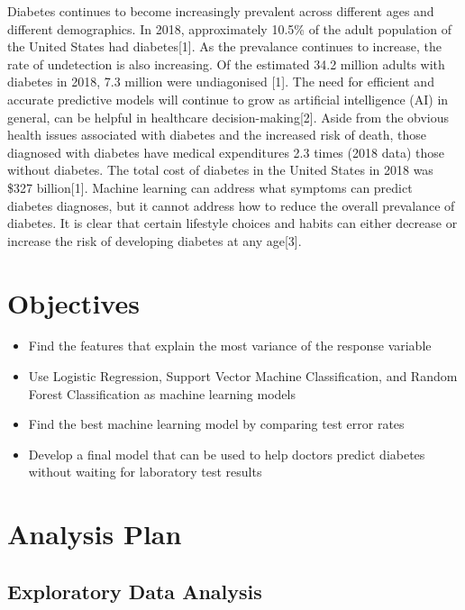 \documentclass[
]{article}
\begin{document}
Diabetes continues to become increasingly prevalent across different
ages and different demographics. In 2018, approximately 10.5\% of the
adult population of the United States had diabetes{[}1{]}. As the
prevalance continues to increase, the rate of undetection is also
increasing. Of the estimated 34.2 million adults with diabetes in 2018,
7.3 million were undiagonised {[}1{]}. The need for efficient and
accurate predictive models will continue to grow as artificial
intelligence (AI) in general, can be helpful in healthcare
decision-making{[}2{]}. Aside from the obvious health issues associated
with diabetes and the increased risk of death, those diagnosed with
diabetes have medical expenditures 2.3 times (2018 data) those without
diabetes. The total cost of diabetes in the United States in 2018 was
\$327 billion{[}1{]}. Machine learning can address what symptoms can
predict diabetes diagnoses, but it cannot address how to reduce the
overall prevalance of diabetes. It is clear that certain lifestyle
choices and habits can either decrease or increase the risk of developing
diabetes at any age{[}3{]}.

\hypertarget{objectives}{%
\section{Objectives}\label{objectives}}

\begin{itemize}
\item
  Find the features that explain the most variance of the response
  variable
\item
  Use Logistic Regression, Support Vector Machine Classification, and
  Random Forest Classification as machine learning models
\item
  Find the best machine learning model by comparing test error rates
\item
  Develop a final model that can be used to help doctors predict
  diabetes without waiting for laboratory test results
\end{itemize}

\hypertarget{analysis-plan}{%
\section{Analysis Plan}\label{analysis-plan}}

\hypertarget{exploratory-data-analysis}{%
\subsection{Exploratory Data Analysis}\label{exploratory-data-analysis}}
\end{document}
